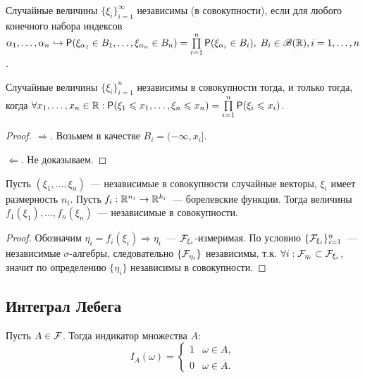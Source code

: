 \begin{definition}
	Случайные величины $\{\xi_i\}_{i = 1}^\infty$ независимы (в совокупности), если для любого конечного набора индексов $\alpha_1, \ldots, \alpha_n \hookrightarrow \mathsf{P}(\xi_{\alpha_1} \in B_1, \ldots, \xi_{\alpha_n} \in B_n) = \prod\limits_{i = 1}^n\mathsf{P}(\xi_{\alpha_i} \in B_i),\; B_i \in \mathscr{B}(\mathbb{R}), i = 1, \ldots, n$.
\end{definition}

\begin{theorem}
	Случайные величины $\{\xi_i\}_{i = 1}^n$ независимы в совокупности тогда, и только тогда, когда $\forall x_1, \ldots, x_n \in \mathbb{R} : \mathsf{P}(\xi_1 \leqslant x_1, \ldots, \xi_n \leqslant x_n) = \prod\limits_{i = 1}^n\mathsf{P}(\xi_i \leqslant x_i)$.
	\begin{proof}
		$\Rightarrow$. Возьмем в качестве $B_i = (-\infty, x_i]$.
		
		$\Leftarrow$. Не доказываем.
	\end{proof}
\end{theorem}

\begin{theorem}
	Пусть $(\xi_1, \ldots, \xi_n)$~--- независимые в совокупности случайные векторы, $\xi_i$ имеет размерность $n_i$. Пусть $f_i: \mathbb{R}^{n_i} \rightarrow \mathbb{R}^{k_i}$~--- борелевские функции. Тогда величины $f_1(\xi_1), \ldots, f_n(\xi_n)$~--- независимые в совокупности.
	\begin{proof}
		Обозначим $\eta_i = f_i(\xi_i) \Rightarrow \eta_i$~--- $\mathcal{F}_{\xi_i}$-измеримая. По условию $\{\mathcal{F}_{\xi_i}\}_{i = 1}^n$~--- независимые $\sigma$-алгебры, следовательно $\{\mathcal{F}_{\eta_i}\}$ независимы, т.к. $\forall i : \mathcal{F}_{\eta_i} \subset \mathcal{F}_{\xi_i}$, значит по определению $\{\eta_i\}$ независимы в совокупности.
	\end{proof}
\end{theorem}

\subsection{Интеграл Лебега}
\begin{definition}
    Пусть $A \in \mathcal{F}$. Тогда индикатор множества $A$:
    \begin{equation*}
        I_A(\omega) = 
         \begin{cases}
           1    &   \omega \in A,   \\
           0    &   \omega \in \overline{A}.
         \end{cases}
        \end{equation*}
\end{definition}

